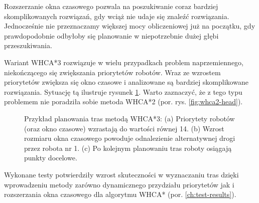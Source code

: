 Rozszerzanie okna czasowego pozwala na poszukiwanie coraz bardziej skomplikowanych rozwiązań, gdy wciąż nie udaje się znaleźć rozwiązania. Jednocześnie nie przeznaczamy większej mocy obliczeniowej już na początku, gdy prawdopodobnie odbyłoby się planowanie w niepotrzebnie dużej głębi przeszukiwania.

Wariant WHCA*3 rozwiązuje w wielu przypadkach problem naprzemiennego, niekończącego się zwiększania priorytetów robotów.
Wraz ze wzrostem priorytetów zwiększa się okno czasowe i analizowane są bardziej skomplikowane rozwiązania.
Sytuację tą ilustruje rysunek \ref{fig:whca3-head}.
Warto zaznaczyć, że z tego typu problemem nie poradziła sobie metoda WHCA*2 (por. rys. \ref{fig:whca2-head}).
\begin{figure}[H]
	\centering
		\qquad
		\qquad
	\caption{Przykład planowania tras metodą WHCA*3:
	(a) Priorytety robotów (oraz okno czasowe) wzrastają do wartości równej 14.
	(b) Wzrost rozmiaru okna czasowego powoduje odnalezienie alternatywnej drogi przez robota nr 1.
	(c) Po kolejnym planowaniu tras roboty osiągają punkty docelowe.}
	\label{fig:whca3-head}
\end{figure}


Wykonane testy potwierdziły wzrost skuteczności w wyznaczaniu tras dzięki wprowadzeniu metody zarówno dynamicznego przydziału priorytetów jak i rozszerzania okna czasowego dla algorytmu WHCA* (por. \ref{ch:test-results}).